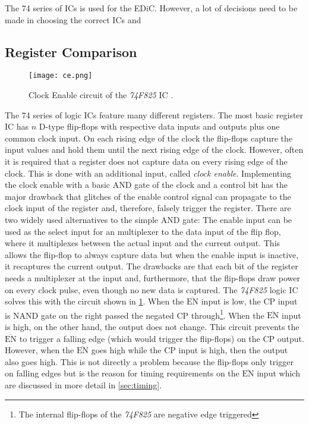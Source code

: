 The 74 series of \glspl{IC} is used for the \gls{EDiC}.
However, a lot of decisions need to be made in choosing the correct \glspl{IC} and
\subsection{Register Comparison}
\begin{figure}[t]
  \centering
  \texttt{[image: ce.png]}
  \caption{Clock Enable circuit of the \emph{74F825} \gls{IC} \cite{74f825}.}
  \label{fig:clockEnable}
\end{figure}
The 74 series of logic \glspl{IC} feature many different registers.
The most basic register \gls{IC} has $n$ D-type flip-flops with respective data inputs and outputs plus one common clock input.
On each rising edge of the clock the flip-flops capture the input values and hold them until the next rising edge of the clock.
However, often it is required that a register does not capture data on every rising edge of the clock.
This is done with an additional input, called \emph{clock enable}.
Implementing the clock enable with a basic AND gate of the clock and a control bit has the major drawback that glitches of the enable control signal can propagate to the clock input of the register and, therefore, falsely trigger the register.
There are two widely used alternatives to the simple AND gate:
The enable input can be used as the select input for an multiplexer to the data input of the flip flop, where it multiplexes between the actual input and the current output.
This allows the flip-flop to always capture data but when the enable input is inactive, it recaptures the current output.
The drawbacks are that each bit of the register needs a multiplexer at the input and, furthermore, that the flip-flops draw power on every clock pulse, even though no new data is captured.
The \emph{74F825} logic \gls{IC} solves this with the circuit shown in \cref{fig:clockEnable}.
When the $\overline{\text{EN}}$ input is low, the CP input is NAND gate on the right passed the negated CP through\footnote{The internal flip-flops of the \emph{74F825} are negative edge triggered}.
When the $\overline{\text{EN}}$ input is high, on the other hand, the output does not change.
This circuit prevents the $\overline{\text{EN}}$ to trigger a falling edge (which would trigger the flip-flops) on the CP output.
However, when the $\overline{\text{EN}}$ goes high while the CP input is high, then the output also goes high.
This is not directly a problem because the flip-flops only trigger on falling edges but is the reason for timing requirements on the $\overline{\text{EN}}$ input which are discussed in more detail in \cref{sec:timing}.
